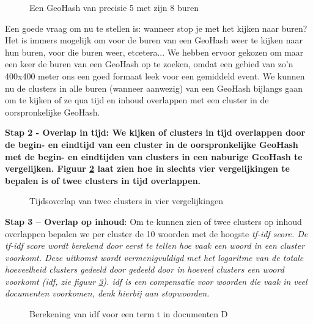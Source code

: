 {{\begin{bullets}
\begin{figure}[H]
  \centering
    \caption{Een GeoHash van precisie 5 met zijn 8 buren}
  \label{geoneigh}
\end{figure}

Een goede vraag om nu te stellen is: wanneer stop je met het kijken naar buren? 
Het is immers mogelijk om voor de buren van een GeoHash weer te kijken naar hun 
buren, voor die buren weer, etcetera... We hebben ervoor gekozen om maar een 
keer de buren van een GeoHash op te zoeken, omdat een gebied van zo'n 400x400 
meter ons een goed formaat leek voor een gemiddeld event. 
\vl
We kunnen nu de clusters in alle buren (wanneer aanwezig) van een GeoHash 
bijlangs gaan om te kijken of ze qua tijd en inhoud overlappen met een cluster 
in de oorspronkelijke GeoHash.

\item \bf{Stap 2 - Overlap in tijd}: We kijken of clusters in tijd overlappen door de 
begin- en eindtijd van een cluster in de oorspronkelijke GeoHash met de begin- 
en eindtijden van clusters in een naburige GeoHash te vergelijken. Figuur \ref{overlap} laat 
zien hoe in slechts vier vergelijkingen te bepalen is of twee clusters in tijd 
overlappen.

\begin{figure}[H]
  \centering
    \caption{Tijdsoverlap van twee clusters in vier vergelijkingen}
  \label{overlap}
\end{figure}

\item \textbf{Stap 3 – Overlap op inhoud}: Om te kunnen zien of twee clusters op inhoud 
overlappen bepalen we per cluster de 10 woorden met de hoogste \it{tf-idf score}. De 
tf-idf score wordt berekend door eerst te tellen hoe vaak een woord in een 
cluster voorkomt. Deze uitkomst wordt vermenigvuldigd met het logaritme van de 
totale hoeveelheid clusters gedeeld door gedeeld door in hoeveel clusters een woord
voorkomt (\it{idf}, zie figuur \ref{idf}). idf is een compensatie voor woorden die vaak in 
veel documenten voorkomen, denk hierbij aan stopwoorden.

\begin{figure}[H]
  \centering
    \caption{Berekening van idf voor een term t in documenten D}
  \label{idf}
\end{figure}

\end{bullets}

}}

